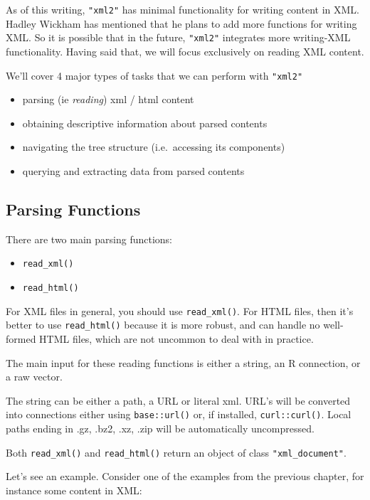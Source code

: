 \documentclass[
]{book}
\providecommand{\tightlist}{%
  \setlength{\itemsep}{0pt}\setlength{\parskip}{0pt}}
\begin{document}
As of this writing, \texttt{"xml2"} has minimal functionality for writing
content in XML. Hadley Wickham has mentioned that he plans to add more functions
for writing XML. So it is possible that in the future, \texttt{"xml2"} integrates
more writing-XML functionality. Having said that, we will focus exclusively on
reading XML content.

We'll cover 4 major types of tasks that we can perform with \texttt{"xml2"}

\begin{itemize}
\tightlist
\item
  parsing (ie \emph{reading}) xml / html content
\item
  obtaining descriptive information about parsed contents
\item
  navigating the tree structure (i.e.~accessing its components)
\item
  querying and extracting data from parsed contents
\end{itemize}

\hypertarget{parsing-functions}{%
\subsection{Parsing Functions}\label{parsing-functions}}

There are two main parsing functions:

\begin{itemize}
\item
  \texttt{read\_xml()}
\item
  \texttt{read\_html()}
\end{itemize}

For XML files in general, you should use \texttt{read\_xml()}. For HTML files, then
it's better to use \texttt{read\_html()} because it is more robust, and can handle
no well-formed HTML files, which are not uncommon to deal with in practice.

The main input for these reading functions is either a string, an R connection,
or a raw vector.

The string can be either a path, a URL or literal xml. URL's will be converted
into connections either using \texttt{base::url()} or, if installed, \texttt{curl::curl()}.
Local paths ending in .gz, .bz2, .xz, .zip will be automatically uncompressed.

Both \texttt{read\_xml()} and \texttt{read\_html()} return an object of class \texttt{"xml\_document"}.

Let's see an example. Consider one of the examples from the previous chapter,
for instance some content in XML:
\end{document}
